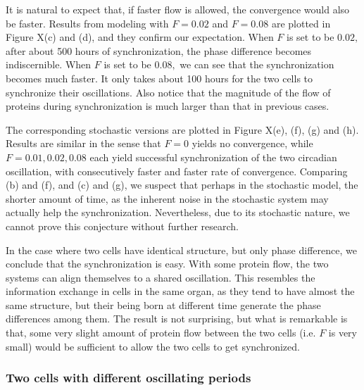 \documentclass[12pt]{article}
\renewcommand{\(}{\left (}
\renewcommand{\)}{\right )}
\begin{document}
It is natural to expect that, if faster flow is allowed, the convergence would also be faster. Results from modeling with $F = 0.02$ and $F=0.08$ are plotted in Figure X(c) and (d), and they confirm our expectation. When $F$ is set to be $0.02,$ after about 500 hours of synchronization, the phase difference becomes indiscernible. When $F$ is set to be $0.08,$ we can see that the synchronization becomes much faster. It only takes about 100 hours for the two cells to synchronize their oscillations. Also notice that the magnitude of the flow of proteins during synchronization is much larger than that in previous cases.

The corresponding stochastic versions are plotted in Figure X(e), (f), (g) and (h). Results are similar in the sense that $F=0$ yields no convergence, while $F = 0.01, 0.02, 0.08$ each yield successful synchronization of the two circadian oscillation, with consecutively faster and faster rate of convergence. Comparing (b) and (f), and (c) and (g), we suspect that perhaps in the stochastic model, the shorter amount of time, as the inherent noise in the stochastic system may actually help the synchronization. Nevertheless, due to its stochastic nature, we cannot prove this conjecture without further research.

In the case where two cells have identical structure, but only phase difference, we conclude that the synchronization is easy. With some protein flow, the two systems can align themselves to a shared oscillation. This resembles the information exchange in cells in the same organ, as they tend to have almost the same structure, but their being born at different time generate the phase differences among them. The result is not surprising, but what is remarkable is that, some very slight amount of protein flow between the two cells (i.e. $F$ is very small) would be sufficient to allow the two cells to get synchronized.

\subsubsection{Two cells with different oscillating periods}
\end{document}
